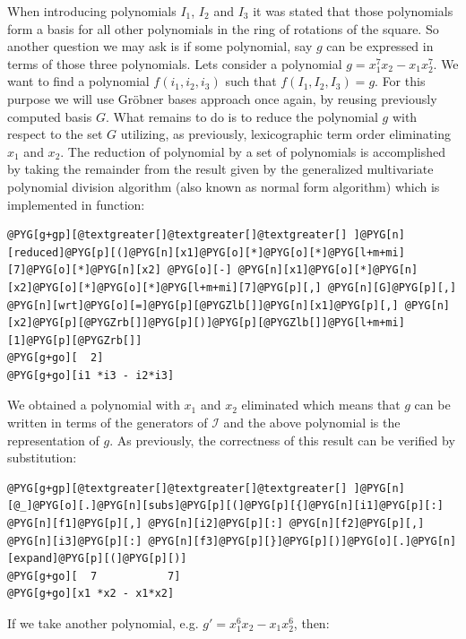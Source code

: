 When introducing polynomials $I_1$, $I_2$ and $I_3$ it was stated that those polynomials
form a basis for all other polynomials in the ring of rotations of the square. So another
question we may ask is if some polynomial, say $g$ can be expressed in terms of those three
polynomials. Lets consider a polynomial $g = x_1^7 x_2 - x_1 x_2^7$. We want to find a
polynomial $f(i_1, i_2, i_3)$ such that $f(I_1, I_2, I_3) = g$. For this purpose we will
use Gröbner bases approach once again, by reusing previously computed basis $G$. What
remains to do is to reduce the polynomial $g$ with respect to the set $G$ utilizing, as
previously, lexicographic term order eliminating $x_1$ and $x_2$. The reduction of polynomial
by a set of polynomials is accomplished by taking the remainder from the result given by the
generalized multivariate polynomial division algorithm (also known as normal form algorithm)
which is implemented in  function:

\begin{Verbatim}[commandchars=@\[\]]
@PYG[g+gp][@textgreater[]@textgreater[]@textgreater[] ]@PYG[n][reduced]@PYG[p][(]@PYG[n][x1]@PYG[o][*]@PYG[o][*]@PYG[l+m+mi][7]@PYG[o][*]@PYG[n][x2] @PYG[o][-] @PYG[n][x1]@PYG[o][*]@PYG[n][x2]@PYG[o][*]@PYG[o][*]@PYG[l+m+mi][7]@PYG[p][,] @PYG[n][G]@PYG[p][,] @PYG[n][wrt]@PYG[o][=]@PYG[p][@PYGZlb[]]@PYG[n][x1]@PYG[p][,] @PYG[n][x2]@PYG[p][@PYGZrb[]]@PYG[p][)]@PYG[p][@PYGZlb[]]@PYG[l+m+mi][1]@PYG[p][@PYGZrb[]]
@PYG[g+go][  2]
@PYG[g+go][i1 *i3 - i2*i3]
\end{Verbatim}
\noindent
We obtained a polynomial with $x_1$ and $x_2$ eliminated which means that $g$ can be written
in terms of the generators of $\mathcal{I}$ and the above polynomial is the representation of
$g$. As previously, the correctness of this result can be verified by substitution:

\begin{Verbatim}[commandchars=@\[\]]
@PYG[g+gp][@textgreater[]@textgreater[]@textgreater[] ]@PYG[n][@_]@PYG[o][.]@PYG[n][subs]@PYG[p][(]@PYG[p][{]@PYG[n][i1]@PYG[p][:] @PYG[n][f1]@PYG[p][,] @PYG[n][i2]@PYG[p][:] @PYG[n][f2]@PYG[p][,] @PYG[n][i3]@PYG[p][:] @PYG[n][f3]@PYG[p][}]@PYG[p][)]@PYG[o][.]@PYG[n][expand]@PYG[p][(]@PYG[p][)]
@PYG[g+go][  7           7]
@PYG[g+go][x1 *x2 - x1*x2]
\end{Verbatim}
\noindent
If we take another polynomial, e.g. $g' = x_1^6 x_2 - x_1 x_2^6$, then:


